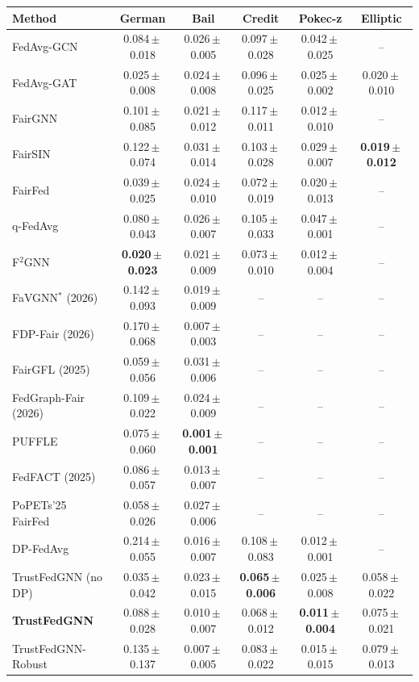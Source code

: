 \begin{tabular}{lccccc}
\toprule
Method & German & Bail & Credit & Pokec-z & Elliptic \\
\midrule
FedAvg-GCN & 0.084\,$\pm$\,0.018 & 0.026\,$\pm$\,0.005 & 0.097\,$\pm$\,0.028 & 0.042\,$\pm$\,0.025 & -- \\
FedAvg-GAT & 0.025\,$\pm$\,0.008 & 0.024\,$\pm$\,0.008 & 0.096\,$\pm$\,0.025 & 0.025\,$\pm$\,0.002 & 0.020\,$\pm$\,0.010 \\
FairGNN & 0.101\,$\pm$\,0.085 & 0.021\,$\pm$\,0.012 & 0.117\,$\pm$\,0.011 & 0.012\,$\pm$\,0.010 & -- \\
FairSIN & 0.122\,$\pm$\,0.074 & 0.031\,$\pm$\,0.014 & 0.103\,$\pm$\,0.028 & 0.029\,$\pm$\,0.007 & \textbf{0.019\,$\pm$\,0.012} \\
FairFed & 0.039\,$\pm$\,0.025 & 0.024\,$\pm$\,0.010 & 0.072\,$\pm$\,0.019 & 0.020\,$\pm$\,0.013 & -- \\
q-FedAvg & 0.080\,$\pm$\,0.043 & 0.026\,$\pm$\,0.007 & 0.105\,$\pm$\,0.033 & 0.047\,$\pm$\,0.001 & -- \\
F$^2$GNN & \textbf{0.020\,$\pm$\,0.023} & 0.021\,$\pm$\,0.009 & 0.073\,$\pm$\,0.010 & 0.012\,$\pm$\,0.004 & -- \\
FaVGNN$^{\ast}$ (2026) & 0.142\,$\pm$\,0.093 & 0.019\,$\pm$\,0.009 & -- & -- & -- \\
FDP-Fair (2026) & 0.170\,$\pm$\,0.068 & 0.007\,$\pm$\,0.003 & -- & -- & -- \\
FairGFL (2025) & 0.059\,$\pm$\,0.056 & 0.031\,$\pm$\,0.006 & -- & -- & -- \\
FedGraph-Fair (2026) & 0.109\,$\pm$\,0.022 & 0.024\,$\pm$\,0.009 & -- & -- & -- \\
PUFFLE & 0.075\,$\pm$\,0.060 & \textbf{0.001\,$\pm$\,0.001} & -- & -- & -- \\
FedFACT (2025) & 0.086\,$\pm$\,0.057 & 0.013\,$\pm$\,0.007 & -- & -- & -- \\
PoPETs'25 FairFed & 0.058\,$\pm$\,0.026 & 0.027\,$\pm$\,0.006 & -- & -- & -- \\
\midrule
DP-FedAvg & 0.214\,$\pm$\,0.055 & 0.016\,$\pm$\,0.007 & 0.108\,$\pm$\,0.083 & 0.012\,$\pm$\,0.001 & -- \\
TrustFedGNN (no DP) & 0.035\,$\pm$\,0.042 & 0.023\,$\pm$\,0.015 & \textbf{0.065\,$\pm$\,0.006} & 0.025\,$\pm$\,0.008 & 0.058\,$\pm$\,0.022 \\
\textbf{TrustFedGNN} & 0.088\,$\pm$\,0.028 & 0.010\,$\pm$\,0.007 & 0.068\,$\pm$\,0.012 & \textbf{0.011\,$\pm$\,0.004} & 0.075\,$\pm$\,0.021 \\
TrustFedGNN-Robust & 0.135\,$\pm$\,0.137 & 0.007\,$\pm$\,0.005 & 0.083\,$\pm$\,0.022 & 0.015\,$\pm$\,0.015 & 0.079\,$\pm$\,0.013 \\
\bottomrule
\end{tabular}